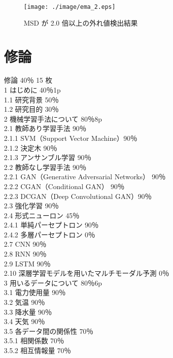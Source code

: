 \begin{figure}[!b]
 \begin{center}
    \texttt{[image: ./image/ema\_2.eps]}
    \caption{MSD が 2.0 倍以上の外れ値検出結果}
 \end{center}
\end{figure}

\newpage
\section{修論}
修論 40％ 15 枚\\  
1 はじめに 40％1p\\
1.1 研究背景 50％\\
1.2 研究目的 30％\\

2 機械学習手法について 80％8p\\ 
2.1 教師あり学習手法 90％\\
2.1.1 SVM（Support Vector Machine）90％\\
2.1.2 決定木 90％\\
2.1.3 アンサンブル学習 90％\\
2.2 教師なし学習手法 90％\\
2.2.1 GAN（Generative Adversarial Networks） 90％\\
2.2.2 CGAN（Conditional GAN） 90％\\
2.2.3 DCGAN（Deep Convolutional GAN）90％\\
2.3 強化学習 90％\\
2.4 形式ニューロン 45％\\
2.4.1 単純パーセプトロン 90％\\
2.4.2 多層パーセプトロン 0％\\
2.7 CNN 90％\\
2.8 RNN 90％\\
2.9 LSTM 90％\\
2.10 深層学習モデルを用いたマルチモーダル予測 0％\\

3 用いるデータについて 80％6p\\
3.1 電力使用量 90％\\
3.2 気温 90％\\
3.3 降水量 90％\\
3.4 天気 90％\\
3.5 各データ間の関係性 70％\\
3.5.1 相関係数 70％\\
3.5.2 相互情報量 70％\\

